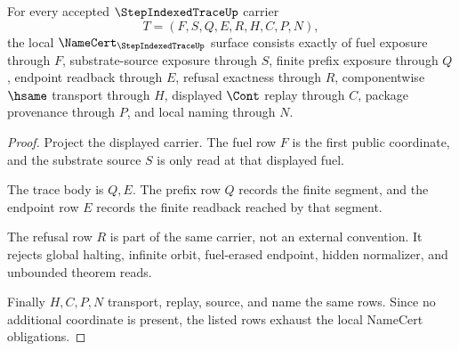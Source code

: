 \begin{theorem}
\label{thm:step-indexed-trace-namecert-obligations}
For every accepted $\StepIndexedTraceUp$ carrier
$$
T=(F,S,Q,E,R,H,C,P,N),
$$
the local $\NameCert_{\StepIndexedTraceUp}$ surface consists exactly of fuel exposure through $F$, substrate-source exposure through $S$, finite prefix exposure through $Q$, endpoint readback through $E$, refusal exactness through $R$, componentwise $\hsame$ transport through $H$, displayed $\Cont$ replay through $C$, package provenance through $P$, and local naming through $N$.
\end{theorem}
\begin{proof}
Project the displayed carrier. The fuel row $F$ is the first public coordinate, and the substrate source $S$ is only read at that displayed fuel.

The trace body is $Q,E$. The prefix row $Q$ records the finite segment, and the endpoint row $E$ records the finite readback reached by that segment.

The refusal row $R$ is part of the same carrier, not an external convention. It rejects global halting, infinite orbit, fuel-erased endpoint, hidden normalizer, and unbounded theorem reads.

Finally $H,C,P,N$ transport, replay, source, and name the same rows. Since no additional coordinate is present, the listed rows exhaust the local NameCert obligations.
\end{proof}


